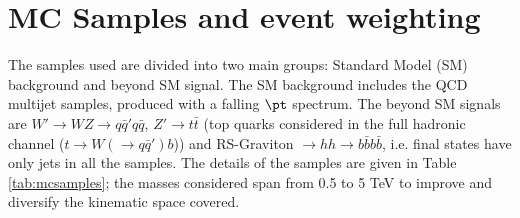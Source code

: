 
\section{MC Samples and event weighting}
The samples used are divided into two main groups: Standard Model (SM) background and beyond SM signal. The SM background includes the QCD multijet samples, produced with a falling $\pt$ spectrum. The beyond SM signals are $W'\to WZ\to q\bar{q}'q\bar{q}$, $Z'\to t\bar{t}$ (top quarks considered in the full hadronic channel ($t\to W(\to q\bar{q}')b$)) and RS-Graviton $\to hh \to b\bar{b}b\bar{b}$, i.e. final states have only jets in all the samples. The details of the samples are given in Table \ref{tab:mcsamples}; the masses considered span from 0.5 to 5 TeV to improve and diversify the kinematic space covered.


